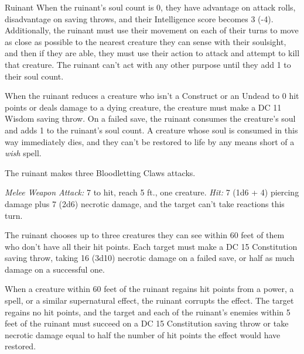 \documentclass[10pt,a4paper,twoside,bg=print,twocolumn,openany,nodeprecatedcode]{dndbook}
\begin{document}
\begin{DndMonster}[float=t]{Ruinant}
\DndMonsterBasics[
armor-class = {15 (natural armor)},
hit-points = {\DndDice{14d8 + 42}},
speed = {60 ft.}
]
\DndMonsterAbilityScores[
 str = 15,
 dex = 18,
 con = 16,
 int = 14,
 wis = 18,
 cha = 16
]
\DndMonsterDetails[
saving-throws = {Wis +7, Cha +6},
skills = {Deception +6, Perception +7},
damage-resistances = {necrotic},
senses = {darkvision 120 ft., soulsight 30 ft., passive perception 17},
languages = {Abyssal, Common, telepathy 120 ft.},
challenge = 6,
]
When the ruinant's soul count is 0, they have advantage on attack rolls, disadvantage on saving throws, and their Intelligence score becomes 3 (-4). Additionally, the ruinant must use their movement on each of their turns to move as close as possible to the nearest creature they can sense with their soulsight, and then if they are able, they must use their action to attack and attempt to kill that creature. The ruinant can't act with any other purpose until they add 1 to their soul count.

When the ruinant reduces a creature who isn't a Construct or an Undead to 0 hit points or deals damage to a dying creature, the creature must make a DC 11 Wisdom saving throw. On a failed save, the ruinant consumes the creature's soul and adds 1 to the ruinant's soul count. A creature whose soul is consumed in this way immediately dies, and they can't be restored to life by any means short of a \textit{wish} spell.

The ruinant makes three Bloodletting Claws attacks.

\textsl{Melee Weapon Attack:} 7 to hit, reach 5 ft., one creature. \textsl{Hit:} 7 (1d6 + 4) piercing damage plus 7 (2d6) necrotic damage, and the target can't take reactions this turn.

The ruinant chooses up to three creatures they can see within 60 feet of them who don't have all their hit points. Each target must make a DC 15 Constitution saving throw, taking 16 (3d10) necrotic damage on a failed save, or half as much damage on a successful one.

When a creature within 60 feet of the ruinant regains hit points from a power, a spell, or a similar supernatural effect, the ruinant corrupts the effect. The target regains no hit points, and the target and each of the ruinant's enemies within 5 feet of the ruinant must succeed on a DC 15 Constitution saving throw or take necrotic damage equal to half the number of hit points the effect would have restored.

\end{DndMonster}
\end{document}
